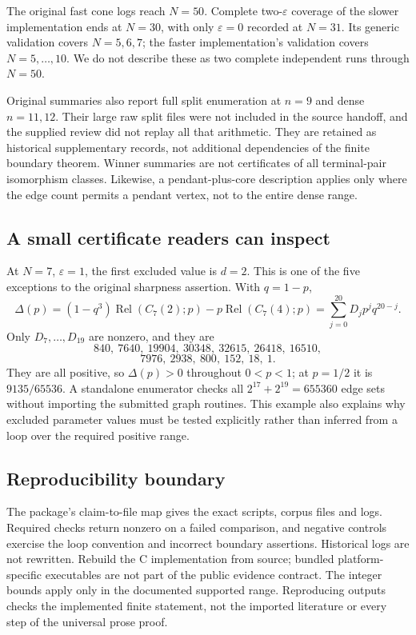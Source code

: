 \documentclass[
  11pt,
]{article}
\theoremstyle{definition}
\theoremstyle{remark}
\begin{document}
The original fast cone logs reach \(N=50\). Complete two-\(\varepsilon\)
coverage of the slower implementation ends at \(N=30\), with only
\(\varepsilon=0\) recorded at \(N=31\). Its generic validation covers
\(N=5,6,7\); the faster implementation's validation covers
\(N=5,\ldots,10\). We do not describe these as two complete independent
runs through \(N=50\).

Original summaries also report full split enumeration at \(n=9\) and
dense \(n=11,12\). Their large raw split files were not included in the
source handoff, and the supplied review did not replay all that
arithmetic. They are retained as historical supplementary records, not
additional dependencies of the finite boundary theorem. Winner summaries
are not certificates of all terminal-pair isomorphism classes. Likewise,
a pendant-plus-core description applies only where the edge count
permits a pendant vertex, not to the entire dense range.

\subsection{A small certificate readers can
inspect}\label{a-small-certificate-readers-can-inspect}

At \(N=7\), \(\varepsilon=1\), the first excluded value is \(d=2\). This
is one of the five exceptions to the original sharpness assertion. With
\(q=1-p\), \[\Delta(p)=(1-q^3)\operatorname{Rel}(C_7(2);p)
-p\operatorname{Rel}(C_7(4);p)
=\sum_{j=0}^{20}D_jp^jq^{20-j}.\] Only \(D_7,\ldots,D_{19}\) are
nonzero, and they are
\[840,\ 7640,\ 19904,\ 30348,\ 32615,\ 26418,\ 16510,\]
\[7976,\ 2938,\ 800,\ 152,\ 18,\ 1.\] They are all positive, so
\(\Delta(p)>0\) throughout \(0<p<1\); at \(p=1/2\) it is \(9135/65536\).
A standalone enumerator checks all \(2^{17}+2^{19}=655360\) edge sets
without importing the submitted graph routines. This example also
explains why excluded parameter values must be tested explicitly rather
than inferred from a loop over the required positive range.

\subsection{Reproducibility boundary}\label{reproducibility-boundary}

The package's claim-to-file map gives the exact scripts, corpus files
and logs. Required checks return nonzero on a failed comparison, and
negative controls exercise the loop convention and incorrect boundary
assertions. Historical logs are not rewritten. Rebuild the C
implementation from source; bundled platform-specific executables are
not part of the public evidence contract. The integer bounds apply only
in the documented supported range. Reproducing outputs checks the
implemented finite statement, not the imported literature or every step
of the universal prose proof.
\end{document}
